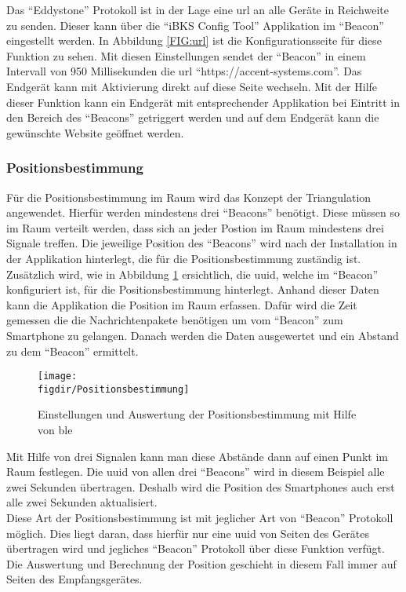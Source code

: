 Das "`Eddystone"' Protokoll ist in der Lage eine \ac{url} an alle Geräte in Reichweite zu senden. Dieser kann über die "`iBKS Config Tool"' Applikation im "`Beacon"' eingestellt werden. In Abbildung \ref{FIG:url} ist die Konfigurationsseite für diese Funktion zu sehen. Mit diesen Einstellungen sendet der "`Beacon"' in einem Intervall von 950 Millisekunden die \ac{url} "`https://accent-systems.com"'. Das Endgerät kann mit Aktivierung direkt auf diese Seite wechseln. Mit der Hilfe dieser Funktion kann ein Endgerät mit entsprechender Applikation bei Eintritt in den Bereich des "`Beacons"' getriggert werden und auf dem Endgerät kann die gewünschte Website geöffnet werden.\\   

\subsubsection{Positionsbestimmung}
\label{sss:ibeacon:position}

Für die Positionsbestimmung im Raum wird das Konzept der Triangulation angewendet. Hierfür werden mindestens drei "`Beacons"' benötigt. Diese müssen so im Raum verteilt werden, dass sich an jeder Postion im Raum mindestens drei Signale treffen. Die jeweilige Position des "`Beacons"' wird nach der Installation in der Applikation hinterlegt, die für die Positionsbestimmung zuständig ist. Zusätzlich wird, wie in Abbildung \ref{FIG:poition} ersichtlich, die \ac{uuid}, welche im "`Beacon"' konfiguriert ist, für die Positionsbestimmung hinterlegt. Anhand dieser Daten kann die Applikation die Position im Raum erfassen. Dafür wird die Zeit gemessen die die Nachrichtenpakete benötigen um vom "`Beacon"' zum Smartphone zu gelangen. Danach werden die Daten ausgewertet und ein Abstand zu dem "`Beacon"' ermittelt.
\begin{figure}[hbtp]
	\centering
	\texttt{[image: \\figdir/Positionsbestimmung]}
	\caption{Einstellungen und Auswertung der Positionsbestimmung mit Hilfe von \ac{ble}}
	\label{FIG:poition}
\end{figure} 
Mit Hilfe von drei Signalen kann man diese Abstände dann auf einen Punkt im Raum festlegen. Die \ac{uuid} von allen drei "`Beacons"' wird in diesem Beispiel alle zwei Sekunden übertragen. Deshalb wird die Position des Smartphones auch erst alle zwei Sekunden aktualisiert.\\

\noindent Diese Art der Positionsbestimmung ist mit jeglicher Art von "`Beacon"' Protokoll möglich. Dies liegt daran, dass hierfür nur eine \ac{uuid} von Seiten des Gerätes übertragen wird und jegliches "`Beacon"' Protokoll über diese Funktion verfügt. Die Auswertung und Berechnung der Position geschieht in diesem Fall immer auf Seiten des Empfangsgerätes.\\ 

